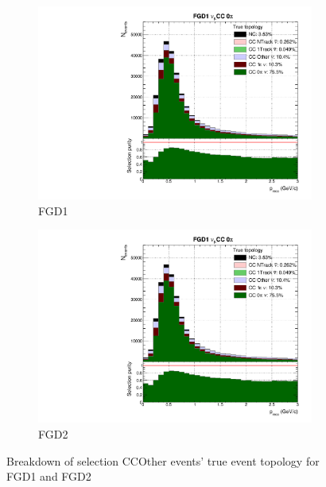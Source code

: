 \begin{figure}[!h]
	\begin{subfigure}[t]{0.49\textwidth}
		\includegraphics[width=\textwidth,page=5, trim={0mm 0mm 0mm 9mm}, clip]{figures/mach3/selection/2017b_Diag_WithSelection}
		\caption{FGD1}
	\end{subfigure}
	\begin{subfigure}[t]{0.49\textwidth}
		\includegraphics[width=\textwidth,page=11, trim={0mm 0mm 0mm 9mm}, clip]{figures/mach3/selection/2017b_Diag_WithSelection}
		\caption{FGD2}
	\end{subfigure}
	\caption{Breakdown of selection CCOther events' true event topology for FGD1 and FGD2 }
	\label{fig:ccoth_topology}
\end{figure}


